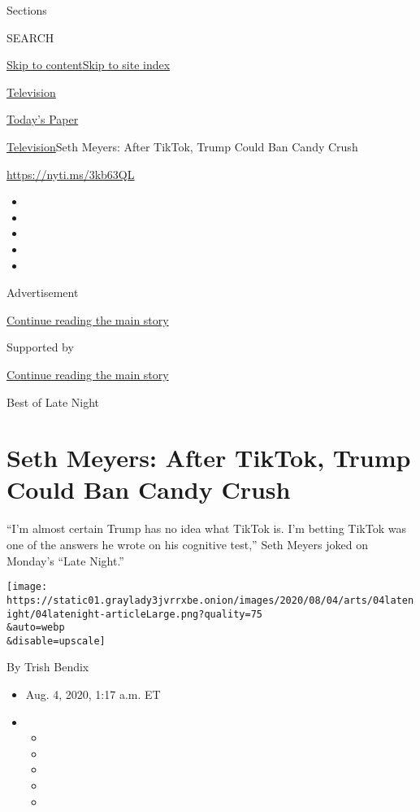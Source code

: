 Sections

SEARCH

\protect\hyperlink{site-content}{Skip to
content}\protect\hyperlink{site-index}{Skip to site index}

\href{https://www.nytimes3xbfgragh.onion/section/arts/television}{Television}

\href{https://myaccount.nytimes3xbfgragh.onion/auth/login?response_type=cookie\&client_id=vi}{}

\href{https://www.nytimes3xbfgragh.onion/section/todayspaper}{Today's
Paper}

\href{/section/arts/television}{Television}\textbar{}Seth Meyers: After
TikTok, Trump Could Ban Candy Crush

\url{https://nyti.ms/3kb63QL}

\begin{itemize}
\item
\item
\item
\item
\item
\end{itemize}

Advertisement

\protect\hyperlink{after-top}{Continue reading the main story}

Supported by

\protect\hyperlink{after-sponsor}{Continue reading the main story}

Best of Late Night

\hypertarget{seth-meyers-after-tiktok-trump-could-ban-candy-crush}{%
\section{Seth Meyers: After TikTok, Trump Could Ban Candy
Crush}\label{seth-meyers-after-tiktok-trump-could-ban-candy-crush}}

``I'm almost certain Trump has no idea what TikTok is. I'm betting
TikTok was one of the answers he wrote on his cognitive test,'' Seth
Meyers joked on Monday's ``Late Night.''

\texttt{[image: https://static01.graylady3jvrrxbe.onion/images/2020/08/04/arts/04latenight/04latenight-articleLarge.png?quality=75\\\&auto=webp\\\&disable=upscale]}

By Trish Bendix

\begin{itemize}
\item
  Aug. 4, 2020, 1:17 a.m. ET
\item
  \begin{itemize}
  \item
  \item
  \item
  \item
  \item
  \end{itemize}
\end{itemize}

